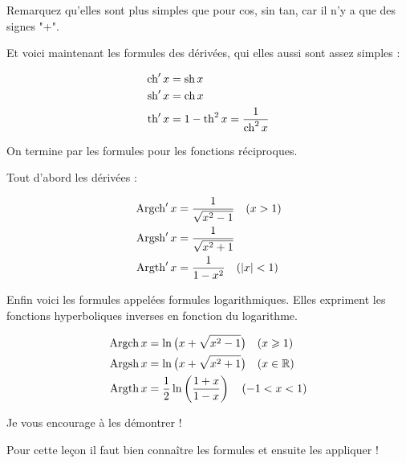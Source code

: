 Remarquez qu'elles sont plus simples que pour cos, sin tan, 
car il n'y a que des signes "+".

\change

Et voici maintenant les formules des dérivées, qui elles aussi sont assez simples :

\begin{align*}
\mathop{\mathrm{ch}}\nolimits'x&= \mathop{\mathrm{sh}}\nolimits x\\
\mathop{\mathrm{sh}}\nolimits'x&=\mathop{\mathrm{ch}}\nolimits x\\
\mathop{\mathrm{th}}\nolimits' x &= 1-\mathop{\mathrm{th}}\nolimits^2x=\frac{1}{\mathop{\mathrm{ch}}\nolimits^2x}\\
\end{align*}


\diapo

On termine par les formules pour les fonctions réciproques. 

Tout d'abord les dérivées :


\begin{align*}
\mathop{\mathrm{Argch}}\nolimits'x&=\frac{1}{\sqrt{x^2-1}} \quad (x>1)\\
\mathop{\mathrm{Argsh}}\nolimits'x&=\frac{1}{\sqrt{x^2+1}} \\
\mathop{\mathrm{Argth}}\nolimits'x&=\frac{1}{1-x^2} \quad (|x|<1)\\
\end{align*}

\change


Enfin voici les formules appelées formules logarithmiques.
Elles expriment les fonctions hyperboliques inverses en fonction du logarithme.


\begin{align*}
\mathop{\mathrm{Argch}}\nolimits x&= \ln\big(x+ \sqrt{x^2-1}\big) \quad (x\geqslant1)\\
\mathop{\mathrm{Argsh}}\nolimits x&= \ln\big(x+ \sqrt{x^2+1}\big)  \quad (x \in \mathbb{R}) \\
\mathop{\mathrm{Argth}}\nolimits x&= \frac12\ln\left(\frac{1+x}{1-x}\right) \quad (-1<x<1) \\
\end{align*}

Je vous encourage à les démontrer !



\diapo

Pour cette leçon il faut bien connaître les formules et ensuite 
les appliquer !





